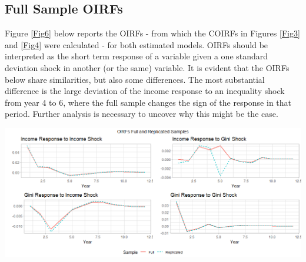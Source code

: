 \documentclass[11pt,preprint, authoryear]{elsarticle}
\let\origfigure\figure
\let\endorigfigure\endfigure
\renewenvironment{figure}[1][2] {
    \expandafter\origfigure\expandafter[H]
} {
    \endorigfigure
}
\numberwithin{equation}{section}
\numberwithin{figure}{section}
\numberwithin{table}{section}
\begin{document}
\hypertarget{full-sample-oirfs}{%
\subsection{\texorpdfstring{Full Sample OIRFs
\label{B}}{Full Sample OIRFs }}\label{full-sample-oirfs}}

Figure \ref{Fig6} below reports the OIRFs - from which the COIRFs in
Figures \ref{Fig3} and \ref{Fig4} were calculated - for both estimated
models. OIRFs should be interpreted as the short term response of a
variable given a one standard deviation shock in another (or the same)
variable. It is evident that the OIRFs below share similarities, but
also some differences. The most substantial difference is the large
deviation of the income response to an inequality shock from year 4 to
6, where the full sample changes the sign of the response in that
period. Further analysis is necessary to uncover why this might be the
case.

\begin{figure}[H]
\includegraphics[width=1\linewidth]{images/Appendix_B_OIRFs_both_samples} \caption{\label{Fig6}}\label{fig:AppB}
\end{figure}


\end{document}
